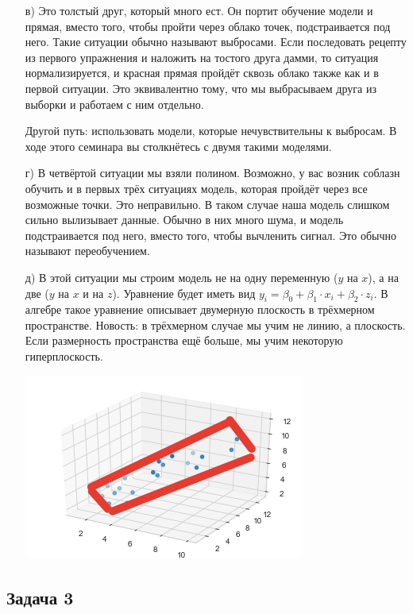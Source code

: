 \documentclass[12pt, a4paper, oneside]{article}
\begin{document}
{\begin{enumerate}
	\item[в)]  Это толстый друг, который много ест.  Он портит обучение модели и прямая, вместо того, чтобы пройти через облако точек, подстраивается под него. Такие ситуации обычно называют выбросами. Если последовать рецепту из первого упражнения и наложить на тостого друга дамми, то ситуация нормализируется, и красная прямая пройдёт сквозь облако также как и в первой ситуации. Это эквивалентно тому, что мы выбрасываем друга из выборки и работаем с ним отдельно.
		
	Другой путь: использовать модели, которые нечувствительны к выбросам. В ходе этого семинара вы столкнётесь с двумя такими моделями.
	
	\item[г)]  В четвёртой ситуации мы взяли полином. Возможно, у вас возник соблазн обучить и в первых трёх ситуациях модель, которая пройдёт через все возможные точки. Это неправильно. В таком случае наша модель слишком сильно вылизывает данные. Обычно в них много шума, и модель подстраивается под него, вместо того, чтобы вычленить сигнал. Это обычно называют переобучением.
	
	\item[д)]  В этой ситуации мы строим модель не на одну переменную ($y$ на $x$), а на две ($y$ на $x$ и на $z$). Уравнение будет иметь вид $y_i = \beta_0 + \beta_1 \cdot x_i + \beta_2 \cdot z_i$. В алгебре такое уравнение описывает двумерную плоскость в трёхмерном пространстве. Новость: в трёхмерном случае мы учим не линию, а плоскость. Если размерность пространства ещё больше, мы учим некоторую гиперплоскость. 
	
	 \begin{center}
	 	\includegraphics[scale=0.8]{regr_pic_5_ans.png}
	 \end{center}
	
\end{enumerate}
}


\subsection*{Задача 3}
\end{document}
